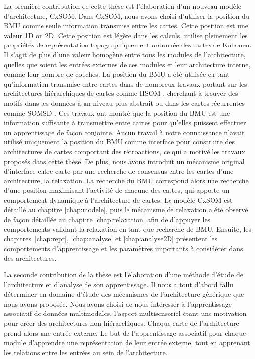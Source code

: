 La première contribution de cette thèse est l'élaboration d'un nouveau modèle d'architecture, CxSOM.
Dans CxSOM, nous avons choisi d'utiliser la position du BMU comme seule information transmise entre les cartes. Cette position est une valeur 1D ou 2D. Cette position est légère dans les calculs, utilise pleinement les propriétés de représentation topographiquement ordonnée des cartes de Kohonen. Il s'agit de plus d'une valeur homogène entre tous les modules de l'architecture, quelles que soient les entrées externes de ces modules et leur architecture interne, comme leur nombre de couches.
La position du BMU a été utilisée en tant qu'information transmise entre cartes dans de nombreux travaux portant sur les architectures hiérarchiques de cartes comme HSOM \parencite{lampinen_clustering_1992}, cherchant à trouver des motifs dans les données à un niveau plus abstrait ou dans les cartes récurrentes comme SOMSD \parencite{hagenbuchner_self-organizing_2003}. 
Ces travaux ont montré que la position du BMU est une information suffisante à transmettre entre cartes pour qu'elles puissent effectuer un apprentissage de façon conjointe.
Aucun travail à notre connaissance n'avait utilisé uniquement la position du BMU comme interface pour construire des architectures de cartes comportant des rétroactions, ce qui a motivé les travaux proposés dans cette thèse.
De plus, nous avons introduit un mécanisme original d'interface entre carte par une recherche de consensus entre les cartes d'une architecture, la relaxation.
La recherche du BMU correspond alors une recherche d'une position maximisant l'activité de chacune des cartes, qui apporte un comportement dynamique à l'architecture de cartes.
Le modèle CxSOM est détaillé au chapitre \ref{chap:modele}, puis le mécanisme de relaxation a été observé de façon détaillée au chapitre \ref{chap:relaxation} afin de d'appuyer les comportements validant la relaxation en tant que recherche de BMU. Ensuite, les chapitres~\ref{chap:repr}, \ref{chap:analyse} et \ref{chap:analyse2D} présentent les comportements d'apprentissage et les paramètres importants à considérer dans des architectures.

La seconde contribution de la thèse est l'élaboration d'une méthode d'étude de l'architecture et d'analyse de son apprentissage. 
Il nous a tout d'abord fallu déterminer un domaine d'étude des mécanismes de l'architecture générique que nous avons proposée. Nous avons choisi de nous intéresser à l'apprentissage associatif de données multimodales, l'aspect multisensoriel étant une motivation pour créer des architectures non-hiérarchiques. Chaque carte de l'architecture prend alors une entrée externe.
Le but de l'apprentissage associatif pour chaque module d'apprendre une représentation de leur entrée externe, tout en apprenant les relations entre les entrées au sein de l'architecture.


